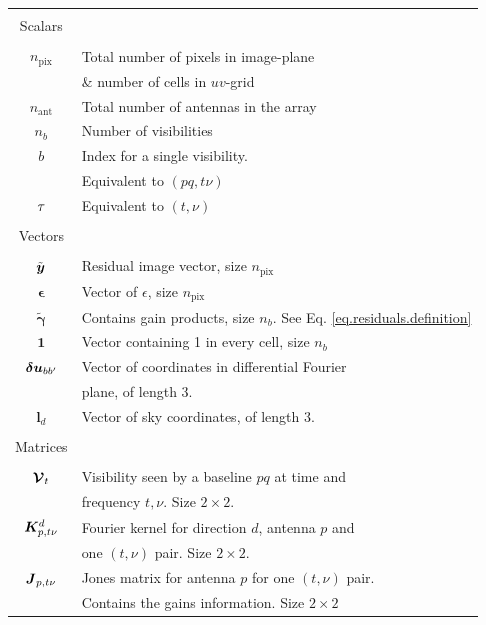 \begin{table}[t!]
\begin{tabular}{c l}
\hline
&\\
Scalars & \\
\cline{1-1}
&\\
$n_{\mathrm{pix}}$ & Total number of pixels in image-plane \\ 
                   &  {\& number of cells in $uv$-grid}\\
$n_{\mathrm{ant}}$ & Total number of antennas in the array\\
$n_b$     & Number of visibilities\\
$b$       & Index for a single visibility.\\
& Equivalent to $\left(pq,t\nu\right)$\\
$\tau$ & Equivalent to $\left(t,\nu\right)$\\
&\\
Vectors & \\
\cline{1-1}
&\\
$\tilde{\bm{{{y}}}}$  & Residual image vector, size $n_{\mathrm{pix}}$\\
$\bm{\epsilon}$       & {Vector of $\epsilon$, size $n_{\mathrm{pix}}$}\\ 
$\bm{\widetilde{\gamma}}$ & Contains  gain products, size $n_b$. See Eq. \ref{eq.residuals.definition}\\
$\mathbf{1}$ & Vector containing 1 in every cell, size $n_b$\\
$\bm{\delta u}_{bb'}$ & Vector of coordinates in differential Fourier\\ & plane, of length $3$.\\
$\bm{l}_d$          & Vector of sky coordinates, of length $3$.\\
&\\
Matrices&\\
\cline{1-1}
&\\
$\bm{\mathcal{V}}_t$       & Visibility seen by a baseline $pq$ at time and \\
& frequency $t,\nu$. Size $2\times 2$.\\
$\bm{K}_{p,t\nu}^d$& Fourier kernel for direction $d$, antenna $p$ and\\
                 &  one $\left(t,\nu\right)$ pair. Size $2 \times 2$.\\
$\bm{{J}}_{p,t\nu}$     & Jones matrix for antenna $p$ for one $\left(t,\nu\right)$ pair.\\
& Contains the gains  information. Size $2 \times 2$\\

\end{tabular}
\end{table}
